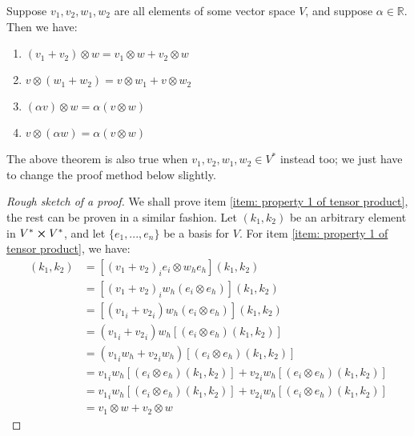       \begin{theorem}
        Suppose $v_1,v_2,w_1,w_2$ are all elements of some vector space
        $V$, and suppose $\alpha \in \mathbb{R}$. Then we have:
        \begin{enumerate}
          \item{$(v_1 + v_2)\otimes w = v_1 \otimes w + v_2 \otimes w$ \label{item: property 1 of tensor product}}
          \item{$v \otimes (w_1 + w_2) = v \otimes w_1 + v \otimes w_2$} 
          \item{$(\alpha v) \otimes w = \alpha (v \otimes w)$} 
          \item{$v \otimes (\alpha w) = \alpha(v \otimes w)$}
        \end{enumerate}
      \end{theorem}
      \begin{remark}
        The above theorem is also true when $v_1,v_2,w_1,w_2 \in V^*$ instead too; we just have to change the proof method below slightly.
      \end{remark}
      \begin{proof}[Rough sketch of a proof]
        We shall prove item \ref{item: property 1 of tensor product}, the
        rest can be proven in a similar fashion. Let $(k_1,k_2)$ be an
        arbitrary element in $V^* \cross V^*$, and let $\{e_1,...,e_n\}$ be
        a basis for $V$. For item \ref{item: property 1 of tensor product},
        we have:
        \begin{align*}
          [(v_1 + v_2)\otimes w](k_1,k_2) 
          &= [(v_1 + v_2)_i e_i \otimes w_h e_h](k_1,k_2) \\
          &= [(v_1 + v_2)_i w_h (e_i \otimes  e_h)](k_1,k_2) \\
          &= [({v_1}_i + {v_2}_i) w_h (e_i \otimes  e_h)](k_1,k_2) \\
          &= ({v_1}_i + {v_2}_i) w_h [(e_i \otimes e_h)(k_1,k_2)] \\
          &= ({v_1}_i w_h + {v_2}_i w_h) [(e_i \otimes e_h)(k_1,k_2)] \\
          &= {v_1}_i w_h [(e_i \otimes e_h)(k_1,k_2)]+ {v_2}_i w_h [(e_i
          \otimes e_h)(k_1,k_2)] \\
          &= {v_1}_i w_h [(e_i \otimes e_h)(k_1,k_2)]+ {v_2}_i w_h [(e_i
          \otimes e_h)(k_1,k_2)] \\
          &= v_1 \otimes w + v_2 \otimes w
        \end{align*}
      \end{proof}
